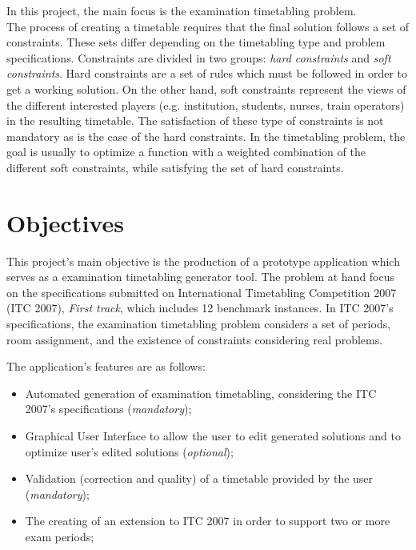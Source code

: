 In this project, the main focus is the examination timetabling problem. \\

The process of creating a timetable requires that the final solution follows a set of constraints. These sets differ depending on the timetabling type and problem specifications. Constraints are divided in two groups: \textit{hard constraints} and \textit{soft constraints}. Hard constraints are a set of rules which must be followed in order to get a working solution. On the other hand, soft constraints represent the views of the different interested players (e.g. institution, students, nurses, train operators) in the resulting timetable. The satisfaction of these type of constraints is not mandatory as is the case of the hard constraints. In the timetabling problem, the goal is usually to optimize a function with a weighted combination of the different soft constraints, while satisfying the set of hard constraints. 

\section{Objectives}

This project's main objective is the production of a prototype application which serves as a examination timetabling generator tool. The problem at hand focus on the specifications submitted on International Timetabling Competition 2007 (ITC 2007), \textit{First track}, which includes 12 benchmark instances. In ITC 2007's specifications, the examination timetabling problem considers a set of periods, room assignment, and the existence of constraints considering real problems.

The application's features are as follows:

\begin{itemize}
	\item Automated generation of examination timetabling, considering the ITC 2007's specifications (\textit{mandatory});
	\item Graphical User Interface to allow the user to edit generated solutions and to optimize user's edited solutions (\textit{optional});
	\item Validation (correction and quality) of a timetable provided by the user (\textit{mandatory});
	\item The creating of an extension to ITC 2007 in order to support two or more exam periods;
\end{itemize}

